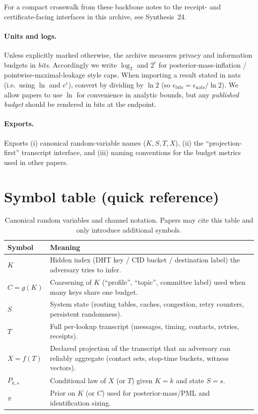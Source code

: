 \documentclass[11pt]{article}
\begin{document}
\noindent For a compact crosswalk from these backbone notes to the receipt- and certificate-facing interfaces in this archive, see Synthesis~24.\cite{series:mathcrosswalk}

\paragraph{Units and logs.}
Unless explicitly marked otherwise, the archive measures privacy and information budgets in \emph{bits}.
Accordingly we write $\log_2$ and $2^{\epsilon}$ for posterior-mass-inflation / pointwise-maximal-leakage style caps.
When importing a result stated in nats (i.e.\ using $\ln$ and $e^{\epsilon}$), convert by dividing by $\ln 2$ (so $\epsilon_{\mathrm{bits}}=\epsilon_{\mathrm{nats}}/\ln 2$).
We allow papers to use $\ln$ for convenience in analytic bounds, but any \emph{published budget} should be rendered in bits at the endpoint.

\paragraph{Exports.}
Exports (i) canonical random-variable names ($K,S,T,X$), (ii) the ``projection-first'' transcript interface, and (iii) naming conventions for the budget metrics used in other papers.

\section{Symbol table (quick reference)}
\begin{table}[t]
\centering
\begin{tabularx}{\linewidth}{@{}lX@{}}
\toprule
Symbol & Meaning \\
\midrule
$K$ & Hidden index (DHT key / CID bucket / destination label) the adversary tries to infer. \\
$C=g(K)$ & Coarsening of $K$ (``profile'', ``topic'', committee label) used when many keys share one budget. \\
$S$ & System state (routing tables, caches, congestion, retry counters, persistent randomness). \\
$T$ & Full per-lookup transcript (messages, timing, contacts, retries, receipts). \\
$X=f(T)$ & Declared projection of the transcript that an adversary can reliably aggregate (contact sets, stop-time buckets, witness vectors). \\
$P_{k,s}$ & Conditional law of $X$ (or $T$) given $K=k$ and state $S=s$. \\
$\pi$ & Prior on $K$ (or $C$) used for posterior-mass/PML and identification sizing. \\
\bottomrule
\end{tabularx}
\caption{Canonical random variables and channel notation. Papers may cite this table and only introduce additional symbols.}
\label{tab:symbols}
\end{table}
\end{document}
